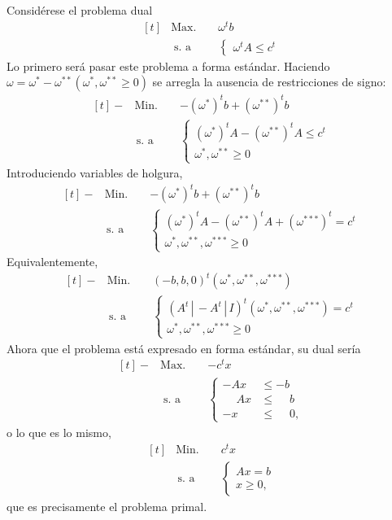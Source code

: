 \documentclass[11pt]{report}
\makeatletter
\renewenvironment{proof}[1][\proofname]{\par
  \pushQED{\qed}%
  \normalfont \topsep\z@skip %
  \trivlist
  \item[\hskip\labelsep
        \itshape
    #1\@addpunct{.}]\ignorespaces
}{%
  \popQED\endtrivlist\@endpefalse
}
\theoremstyle{mytheorem}
\theoremstyle{mydefinition}
\theoremstyle{myexample}
\let\oldproofname=\proofname
\renewcommand{\proofname}{\rm\bf{\oldproofname}}}
\makeatother
\begin{document}
\begin{proof}
Considérese el problema dual
\[
\begin{aligned}[t]
&\text{Max. } && \omega^t b \\
& \; \text{s. a} &&\begin{cases}
    \omega^t A \leq c^t
\end{cases}
\end{aligned}\]
Lo primero será pasar este problema a forma estándar. Haciendo $\omega = \omega^* - \omega^{**} (\omega^*,\omega^{**} \geq 0)$ se arregla la ausencia de restricciones de signo:
\[
\begin{aligned}[t]
-&\text{Min. } && -(\omega^*)^tb+(\omega^{**})^tb \\
 &\, \text{s. a} &&\begin{cases}
    (\omega^*)^t A-(\omega^{**})^tA \leq c^t \\
    \omega^*,\omega^{**} \geq 0
\end{cases}
\end{aligned}\]
Introduciendo variables de holgura,
\[
\begin{aligned}[t]
-&\text{Min. } && -(\omega^*)^tb+(\omega^{**})^tb \\
 &\, \text{s. a} &&\begin{cases}
    (\omega^*)^t A-(\omega^{**})^tA+(\omega^{***})^t = c^t \\
    \omega^*,\omega^{**},\omega^{***} \geq 0
\end{cases}
\end{aligned}\]
Equivalentemente,
\[
\begin{aligned}[t]
-&\text{Min. } && (-b,b,0)^t(\omega^*,\omega^{**},\omega^{***}) \\
 &\, \text{s. a} &&\begin{cases}
    (A^t \, | \, -A^t \, | \, I)^t(\omega^*,\omega^{**},\omega^{***}) = c^t \\
    \omega^*,\omega^{**},\omega^{***} \geq 0
\end{cases}
\end{aligned}\]
Ahora que el problema está expresado en forma estándar, su dual sería
\[
\begin{aligned}[t]
-&\text{Max. } && -c^tx \\
 &\; \text{s. a} && \left\{\begin{alignedat}{1}
    -Ax &\leq -b \\
    \phantom{-}Ax &\leq \phantom{-}b \\
    -x &\leq \phantom{-}0,
\end{alignedat}\right.
\end{aligned}\]
o lo que es lo mismo,
\[
\begin{aligned}[t]
&\text{Min. } && c^tx \\
 &\, \text{s. a} &&\begin{cases}
    Ax = b \\
    x \geq 0,
\end{cases}
\end{aligned}\]
que es precisamente el problema primal.
\end{proof}
\end{document}
